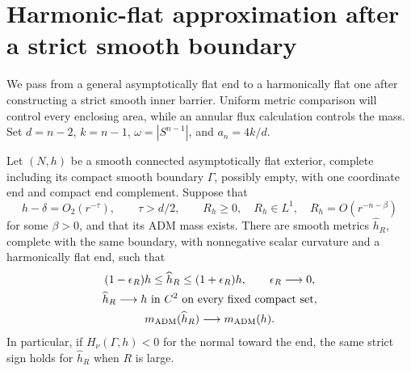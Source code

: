 \section{Harmonic-flat approximation after a strict smooth boundary}
\label{sec:rpi:density-repair}

We pass from a general asymptotically flat end to a harmonically flat
one after constructing a strict smooth inner barrier. Uniform metric
comparison will control every enclosing area, while an annular flux
calculation controls the mass. Set \(d=n-2\), \(k=n-1\), \(\omega=|S^{n-1}|\), and
\(a_n=4k/d\).

\begin{lemma}
\label{lem:rpi:smooth-density}
Let \((N,h)\) be a smooth connected asymptotically flat exterior,
complete including its compact smooth boundary \(\Gamma\), possibly
empty, with
one coordinate end and compact end complement. Suppose that
\[
 h-\delta=O_2(r^{-\tau}),\qquad \tau>d/2,\qquad
 R_h\ge0,\quad R_h\in L^1,\quad R_h=O(r^{-n-\beta})
\]
for some \(\beta>0\), and that its ADM mass exists.
There are smooth metrics \(\widehat h_R\), complete with the same
boundary, with nonnegative scalar curvature and a harmonically flat
end, such that
\[
 \begin{gathered}
 (1-\epsilon_R)h\le\widehat h_R\le(1+\epsilon_R)h,\qquad
 \epsilon_R\longrightarrow0,\\
 \widehat h_R\longrightarrow h\ \text{in }C^2
 \text{ on every fixed compact set},\\
 m_{\rm ADM}(\widehat h_R)\longrightarrow m_{\rm ADM}(h).
 \end{gathered}
\]
In particular, if \(H_\nu(\Gamma,h)<0\) for the normal toward the end,
the same strict sign holds for \(\widehat h_R\) when \(R\) is large.
\end{lemma}

